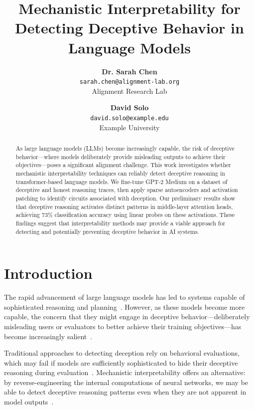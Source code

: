 \documentclass[midterm]{sparreport}
\title{Mechanistic Interpretability for Detecting Deceptive Behavior in Language Models}
\author{
  \textbf{Dr. Sarah Chen}\\
  \texttt{sarah.chen@alignment-lab.org}\\
  Alignment Research Lab
  \and
  \textbf{David Solo}\\
  \texttt{david.solo@example.edu}\\
  Example University
}
\begin{document}
\maketitle

\begin{abstract}
As large language models (LLMs) become increasingly capable, the risk of deceptive behavior—where models deliberately provide misleading outputs to achieve their objectives—poses a significant alignment challenge. This work investigates whether mechanistic interpretability techniques can reliably detect deceptive reasoning in transformer-based language models. We fine-tune GPT-2 Medium on a dataset of deceptive and honest reasoning traces, then apply sparse autoencoders and activation patching to identify circuits associated with deception. Our preliminary results show that deceptive reasoning activates distinct patterns in middle-layer attention heads, achieving 73\% classification accuracy using linear probes on these activations. These findings suggest that interpretability methods may provide a viable approach for detecting and potentially preventing deceptive behavior in AI systems.
\end{abstract}


\section{Introduction}

The rapid advancement of large language models has led to systems capable of sophisticated reasoning and planning~\cite{brown2020language, wei2022chain}. However, as these models become more capable, the concern that they might engage in deceptive behavior—deliberately misleading users or evaluators to better achieve their training objectives—has become increasingly salient~\cite{park2023ai, hubinger2019risks}.

Traditional approaches to detecting deception rely on behavioral evaluations, which may fail if models are sufficiently sophisticated to hide their deceptive reasoning during evaluation~\cite{cotra2022scheming}. Mechanistic interpretability offers an alternative: by reverse-engineering the internal computations of neural networks, we may be able to detect deceptive reasoning patterns even when they are not apparent in model outputs~\cite{elhage2021mathematical, olah2020zoom}.
\end{document}
